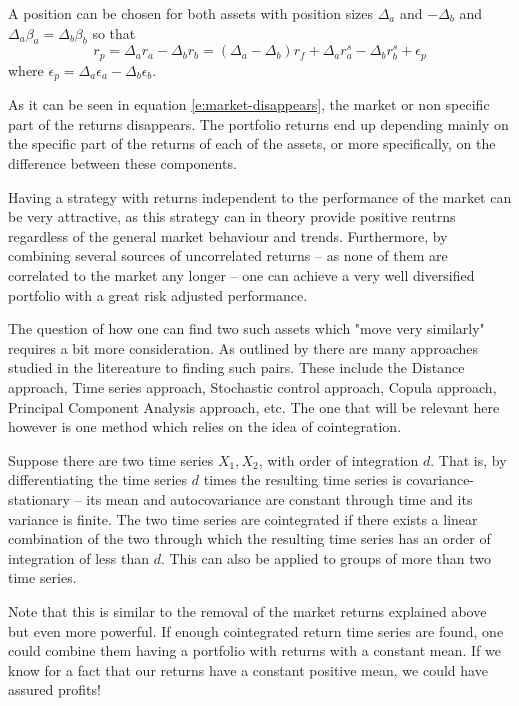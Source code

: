 A position can be chosen for both assets with position sizes $\Delta_a$ and $-\Delta_b$ and $\Delta_a\beta_a=\Delta_b\beta_b$ so that
\begin{equation}
    \label{e:market-disappears}
    r_p=\Delta_ar_a-\Delta_br_b=(\Delta_a-\Delta_b)r_f + \Delta_a r_a^s - \Delta_b r_b^s + \epsilon_p
\end{equation}
where $\epsilon_p = \Delta_a \epsilon_a - \Delta_b \epsilon_b$.

As it can be seen in equation \eqref{e:market-disappears}, the market or non specific part of the returns disappears. The portfolio returns end up depending mainly on the specific part of the returns of each of the assets, or more specifically, on the difference between these components. 

Having a strategy with returns independent to the performance of the market can be very attractive, as this strategy can in theory provide positive reutrns regardless of the general market behaviour and trends. Furthermore, by combining several sources of uncorrelated returns -- as none of them are correlated to the market any longer -- one can achieve a very well diversified portfolio with a great risk adjusted performance. 

The question of how one can find two such assets which "move very similarly" requires a bit more consideration. As outlined by \cite{review_statistical_arbitrage} there are many approaches studied in the litereature to finding such pairs. These include the Distance approach, Time series approach, Stochastic control approach, Copula approach, Principal Component Analysis approach, etc. The one that will be relevant here however is one method which relies on the idea of cointegration. 

Suppose there are two time series $X_1, X_2$, with order of integration $d$. That is, by differentiating the time series $d$ times the resulting time series is covariance-stationary -- its mean and autocovariance are constant through time and its variance is finite. The two time series are cointegrated if there exists a linear combination of the two through which the resulting time series has an order of integration of less than $d$. This can also be applied to groups of more than two time series.  

Note that this is similar to the removal of the market returns explained above but even more powerful. If enough cointegrated return time series are found, one could combine them having a portfolio with returns with a constant mean. If we know for a fact that our returns have a constant positive mean, we could have assured profits!

